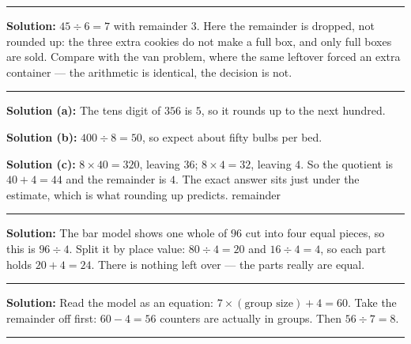 \documentclass[12pt]{article}
\begin{document}
\vspace{0.12cm}\noindent\rule{\linewidth}{0.2pt}


\textbf{Solution:} $45 \div 6 = 7$ with remainder $3$. Here the remainder is dropped, not rounded up:
the three extra cookies do not make a full box, and only full boxes are sold. Compare with the van
problem, where the same leftover forced an extra container --- the arithmetic is identical, the
decision is not. 

\vspace{0.12cm}\noindent\rule{\linewidth}{0.2pt}


\textbf{Solution (a):} The tens digit of $356$ is $5$, so it rounds up to the next hundred. 

\textbf{Solution (b):} $400 \div 8 = 50$, so expect about fifty bulbs per bed. 

\textbf{Solution (c):} $8 \times 40 = 320$, leaving $36$; $8 \times 4 = 32$, leaving $4$. So the
quotient is $40 + 4 = 44$ and the remainder is $4$. The exact answer sits just under the estimate,
which is what rounding up predicts.  \quad remainder 

\vspace{0.12cm}\noindent\rule{\linewidth}{0.2pt}


\textbf{Solution:} The bar model shows one whole of $96$ cut into four equal pieces, so this is
$96 \div 4$. Split it by place value: $80 \div 4 = 20$ and $16 \div 4 = 4$, so each part holds
$20 + 4 = 24$. There is nothing left over --- the parts really are equal. 

\vspace{0.12cm}\noindent\rule{\linewidth}{0.2pt}


\textbf{Solution:} Read the model as an equation: $7 \times (\text{group size}) + 4 = 60$. Take the
remainder off first: $60 - 4 = 56$ counters are actually in groups. Then $56 \div 7 = 8$. 

\vspace{0.12cm}\noindent\rule{\linewidth}{0.2pt}
\end{document}
